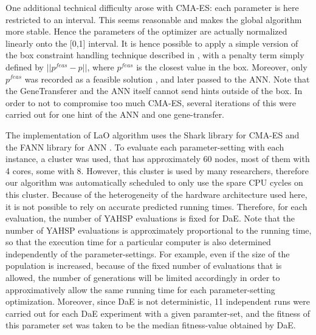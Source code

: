 \documentclass[letterpaper]{article}
\begin{document}
One additional technical difficulty arose with CMA-ES: each parameter is here restricted to an interval. This seems reasonable and makes the global algorithm more stable. Hence the parameters of the optimizer are actually normalized linearly onto the [0,1] interval. It is hence possible to apply a simple version of the box constraint handling technique described in \cite{hansen2009tec}, with a penalty term simply defined by \begin{math}||p^{feas}-p|| \end{math}, where \begin{math}p^{feas}\end{math} is the closest value in the box. Moreover, only \begin{math}p^{feas}\end{math} was recorded as a feasible solution , and later passed to the ANN. Note that the GeneTransferer and the ANN itself cannot send hints outside of the box. In order to not to compromise too much CMA-ES, several iterations of this were carried out for one hint of the ANN and one gene-transfer.

The implementation of LaO algorithm uses the Shark library \cite{shark08} for CMA-ES and the FANN library for ANN \cite{nissen}. To evaluate each parameter-setting with each instance,  a cluster was used, that has approximately 60 nodes, most of them with 4 cores, some with 8. However, this cluster is used by many researchers, therefore our algorithm was automatically scheduled to only use the spare CPU cycles on this cluster. Because of the heterogeneity of the hardware architecture used here, it is not possible to rely on accurate predicted running times. Therefore, for each evaluation, the number of YAHSP evaluations is fixed for DaE. Note that the number of YAHSP evaluations is approximately proportional to the running time, so that the execution time for a particular computer is also determined independently of the parameter-settings. For example, even if the size of the population is increased, because of the fixed number of evaluations that is allowed, the number of generations will be limited accordingly in order to approximatively allow the same running time for each parameter-setting optimization. Moreover, since DaE is not deterministic, 11 independent runs were carried out for each DaE experiment with a given paramter-set, and the fitness of this parameter set was taken to be the median fitness-value obtained by DaE.
\end{document}
